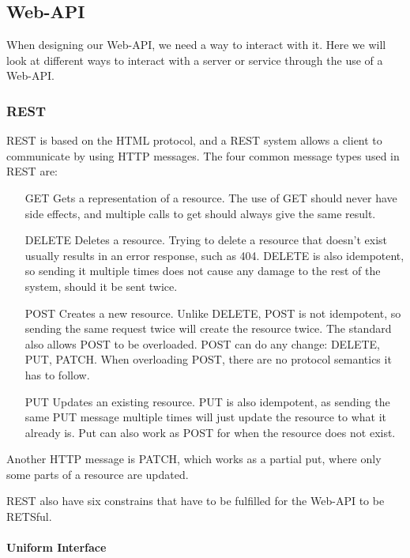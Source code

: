 
\subsection{Web-API}
When designing our Web-API, we need a way to interact with it. Here we will look at different ways to interact with a server or service through the use of a Web-API.

\subsubsection{REST}
REST is based on the HTML protocol, and a REST system allows a client to communicate by using HTTP messages.
The four common message types used in REST are:
\begin{itemize}
\item[GET] Gets a representation of a resource. The use of GET should never have side effects, and multiple calls to get should always give the same result.
\item[DELETE] Deletes a resource. Trying to delete a resource that doesn't exist usually results in an error response, such as 404. DELETE is also idempotent, so sending it multiple times does not cause any damage to the rest of the system, should it be sent twice.
\item[POST] Creates a new resource. Unlike DELETE, POST is not idempotent, so sending the same request twice will create the resource twice. 
The standard also allows POST to be overloaded. POST can do any change: DELETE, PUT, PATCH. When overloading POST, there are no protocol semantics it has to follow.
\item[PUT] Updates an existing resource. PUT is also idempotent, as sending the same PUT message multiple times will just update the resource to what it already is. Put can also work as POST for when the resource does not exist.
\end{itemize}

Another HTTP message is PATCH, which works as a partial put, where only some parts of a resource are updated.

REST also have six constrains that have to be fulfilled for the Web-API to be RETSful.

\paragraph{Uniform Interface} 
